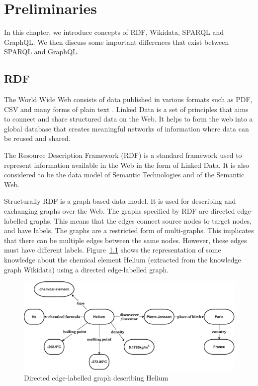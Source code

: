\chapter{Preliminaries}
\label{ch:2}
In this chapter, we introduce concepts of RDF, Wikidata, SPARQL and GraphQL. We then discuss some important differences that exist between SPARQL and GraphQL.
\section{RDF}
The World Wide Web consists of data published in various formats such as PDF, CSV and many forms of plain text \cite{Ruth2013}. Linked Data is a set of principles that aims to connect and share structured data on the Web. It helps to form the web into a global database that creates meaningful networks of information where data can be reused and shared. 

The Resource Description Framework (RDF) is a standard framework used to represent information available in the Web in the form of Linked Data. It is also considered to be the data model of Semantic Technologies and of the Semantic Web.

Structurally RDF is a graph based data model. It is used for describing and exchanging graphs over the Web. The graphs specified by RDF are directed edge-labelled graphs. This means that the edges connect source nodes to target nodes, and have labels. The graphs are a restricted form of multi-graphs. This implicates that there can be multiple edges between the same nodes. However, these edges must have different labels. Figure~\ref{fig:2} shows the representation of some knowledge about the chemical element Helium (extracted from the knowledge graph Wikidata) using a directed edge-labelled graph. 


\begin{figure}[h]
  \centering
  \includegraphics[width=0.75\linewidth]{images/del_graph.drawio.pdf}
  \caption{Directed edge-labelled graph describing Helium}
  \label{fig:2}
\end{figure}

